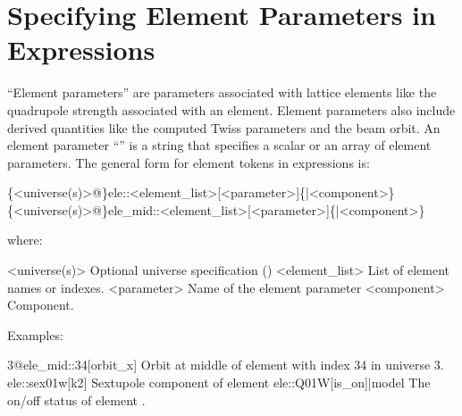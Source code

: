 \section{Specifying Element Parameters in Expressions}
\label{s:ele.token}

``Element parameters'' are parameters associated with lattice elements like the quadrupole strength
associated with an element. Element parameters also include derived quantities like the computed
Twiss parameters and the beam orbit. An element parameter ``'' is a string that specifies
a scalar or an array of element parameters. The general form for element tokens in expressions is:
\begin{example}
  \{<universe(s)>@\}ele::<element_list>[<parameter>]\{|<component>\}
  \{<universe(s)>@\}ele_mid::<element_list>[<parameter>]\{|<component>\}
\end{example}
where:
\begin{example}
  <universe(s)>       Optional universe specification ()
  <element_list>      List of element names or indexes.
  <parameter>         Name of the element parameter
  <component>         Component. 
\end{example}
Examples:
\begin{example}
  3@ele_mid::34[orbit_x]     Orbit at middle of element with index 34 in universe 3.
  ele::sex01w[k2]            Sextupole component of element 
  ele::Q01W[is_on]|model     The on/off status of element .
\end{example}

